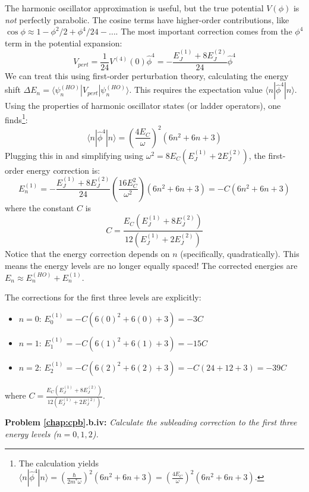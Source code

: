 \documentclass{book}
\newenvironment{problem}[1][Problem]{\par\medskip\noindent\textbf{#1:}\em}{\par\medskip}
\begin{document}
The harmonic oscillator approximation is useful, but the true potential \(V(\phi)\) is \textit{not} perfectly parabolic. The cosine terms have higher-order contributions, like \(\cos\phi \approx 1 - \phi^2/2 + \phi^4/24 - \dots\). The most important correction comes from the \(\phi^4\) term in the potential expansion:
\[ V_{pert} = \frac{1}{24} V^{(4)}(0) \hat{\phi}^4 = -\frac{E_J^{(1)} + 8 E_J^{(2)}}{24} \hat{\phi}^4 \]
We can treat this using first-order perturbation theory, calculating the energy shift \(\Delta E_n = \langle \psi_n^{(HO)} | V_{pert} | \psi_n^{(HO)} \rangle\). This requires the expectation value \(\langle n | \hat{\phi}^4 | n \rangle\). Using the properties of harmonic oscillator states (or ladder operators), one finds\footnote{The calculation yields \(\langle n | \hat{\phi}^4 | n \rangle = (\frac{\hbar}{2m^*\omega})^2 (6n^2+6n+3) = (\frac{4E_C}{\omega})^2 (6n^2+6n+3)\).}:
\[ \langle n | \hat{\phi}^4 | n \rangle = \left(\frac{4E_C}{\omega}\right)^2 (6n^2 + 6n + 3) \]
Plugging this in and simplifying using \(\omega^2 = 8 E_C (E_J^{(1)} + 2 E_J^{(2)})\), the first-order energy correction is:
\begin{equation}
E_n^{(1)} = -\frac{E_J^{(1)} + 8 E_J^{(2)}}{24} \left(\frac{16 E_C^2}{\omega^2}\right) (6n^2 + 6n + 3) = -C (6 n^2 + 6 n + 3)
\end{equation}
where the constant \(C\) is
\[ C = \frac{E_C (E_J^{(1)} + 8 E_J^{(2)})}{12 (E_J^{(1)} + 2 E_J^{(2)})} \]
Notice that the energy correction depends on \(n\) (specifically, quadratically). This means the energy levels are no longer equally spaced! The corrected energies are \(E_n \approx E_n^{(HO)} + E_n^{(1)}\).



The corrections for the first three levels are explicitly:
\begin{itemize}
    \item \(n=0\): \(E_0^{(1)} = -C (6(0)^2 + 6(0) + 3) = -3C\)
    \item \(n=1\): \(E_1^{(1)} = -C (6(1)^2 + 6(1) + 3) = -15C\)
    \item \(n=2\): \(E_2^{(1)} = -C (6(2)^2 + 6(2) + 3) = -C (24 + 12 + 3) = -39C\)
\end{itemize}
where $C = \frac{E_C (E_J^{(1)} + 8 E_J^{(2)})}{12 (E_J^{(1)} + 2 E_J^{(2)})}$.


\begin{problem}[Problem \ref{chap:cpb}.b.iv] 
Calculate the subleading correction to the first three energy levels (\(n=0, 1, 2\)).
\end{problem}
\end{document}
